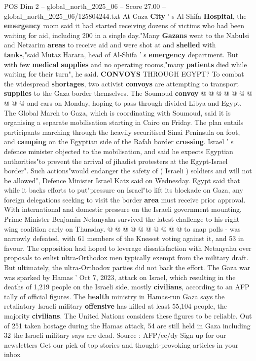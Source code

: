 \begin{textsample}{POS Dim 2 – global\_north\_2025\_06 – Score 27.00 – global\_north\_2025\_06/125804244.txt}
At Gaza \textbf{City} ' s Al-Shifa \textbf{Hospital}, the \textbf{emergency} room said it had started receiving dozens of victims who had been waiting for aid, including 200 in a single day."Many \textbf{Gazans} went to the Nabulsi and Netzarim \textbf{areas} to receive aid and were shot at and \textbf{shelled} with \textbf{tanks},"said Mutaz Harara, head of Al-Shifa ' s \textbf{emergency} department.
But with few \textbf{medical} \textbf{supplies} and no operating rooms,"many \textbf{patients} died while waiting for their turn", he said. \textbf{CONVOYS} THROUGH EGYPT?
To combat the widespread \textbf{shortages}, two activist \textbf{convoys} are attempting to transport \textbf{supplies} to the Gaza border themselves.
The Soumoud \textbf{convoy} @ @ @ @ @ @ @ @ @ @ and cars on Monday, hoping to pass through divided Libya and Egypt.
The Global March to Gaza, which is coordinating with Soumoud, said it is organising a separate mobilisation starting in Cairo on Friday.
The plan entails participants marching through the heavily securitised Sinai Peninsula on foot, and \textbf{camping} on the Egyptian side of the Rafah border \textbf{crossing}.
Israel ' s defence minister objected to the mobilisation, and said he expects Egyptian authorities"to prevent the arrival of jihadist protesters at the Egypt-Israel border".
Such actions"would endanger the safety of ( Israeli ) soldiers and will not be allowed", Defence Minister Israel Katz said on Wednesday.
Egypt said that while it backs efforts to put"pressure on Israel"to lift its blockade on Gaza, any foreign delegations seeking to visit the border \textbf{area} must receive prior approval.
With international and domestic pressure on the Israeli government mounting, Prime Minister Benjamin Netanyahu survived the latest challenge to his right-wing coalition early on Thursday. @ @ @ @ @ @ @ @ @ @ to snap polls - was narrowly defeated, with 61 members of the Knesset voting against it, and 53 in favour.
The opposition had hoped to leverage dissatisfaction with Netanyahu over proposals to enlist ultra-Orthodox men typically exempt from the military draft.
But ultimately, the ultra-Orthodox parties did not back the effort.
The Gaza war was sparked by Hamas ' Oct 7, 2023, attack on Israel, which resulting in the deaths of 1,219 people on the Israeli side, mostly \textbf{civilians}, according to an AFP tally of official figures.
The \textbf{health} ministry in Hamas-run Gaza says the retaliatory Israeli military \textbf{offensive} has killed at least 55,104 people, the majority \textbf{civilians}.
The United Nations considers these figures to be reliable.
Out of 251 taken hostage during the Hamas attack, 54 are still held in Gaza including 32 the Israeli military says are dead.
Source : AFP/ec/dy Sign up for our newsletters Get our pick of top stories and thought-provoking articles in your inbox

\end{textsample}
